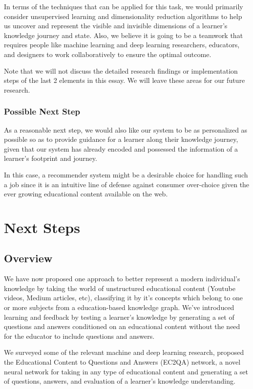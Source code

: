 \documentclass[]{book}
\theoremstyle{definition}
\theoremstyle{definition}
\theoremstyle{definition}
\theoremstyle{remark}
\begin{document}
In terms of the techniques that can be applied for this task, we would
primarily consider unsupervised learning and dimensionality reduction
algorithms to help us uncover and represent the visible and invisible
dimensions of a learner's knowledge journey and state. Also, we believe
it is going to be a teamwork that requires people like machine learning
and deep learning researchers, educators, and designers to work
collaboratively to ensure the optimal outcome.

Note that we will not discuss the detailed research findings or
implementation steps of the last 2 elements in this essay. We will leave
these areas for our future research.

\subsection{Possible Next Step}\label{possible-next-step}

As a reasonable next step, we would also like our system to be as
personalized as possible so as to provide guidance for a learner along
their knowledge journey, given that our system has already encoded and
possessed the information of a learner's footprint and journey.

In this case, a recommender system might be a desirable choice for
handling such a job since it is an intuitive line of defense against
consumer over-choice given the ever growing educational content
available on the web.

\chapter{Next Steps}\label{next-steps}

\section{Overview}\label{overview}

We have now proposed one approach to better represent a modern
individual's knowledge by taking the world of unstructured educational
content (Youtube videos, Medium articles, etc), classifying it by it's
concepts which belong to one or more subjects from a education-based
knowledge graph. We've introduced learning and feedback by testing a
learner's knowledge by generating a set of questions and answers
conditioned on an educational content without the need for the educator
to include questions and answers.

We surveyed some of the relevant machine and deep learning research,
proposed the Educational Content to Questions and Answers (EC2QA)
network, a novel neural network for taking in any type of educational
content and generating a set of questions, answers, and evaluation of a
learner's knowledge understanding.
\end{document}
